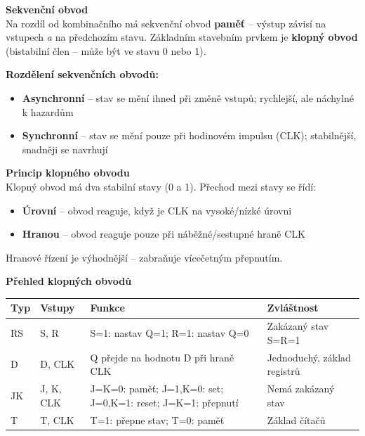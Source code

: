 \documentclass[a4paper,10pt]{article}
\begin{document}
\begin{vysvetlenibox}
\textbf{Sekvenční obvod}\\
Na rozdíl od kombinačního má sekvenční obvod \textbf{paměť} -- výstup závisí
na vstupech \textit{a} na předchozím stavu. Základním stavebním prvkem je
\textbf{klopný obvod} (bistabilní člen -- může být ve stavu 0 nebo 1).

\textbf{Rozdělení sekvenčních obvodů:}
\begin{itemize}[noitemsep, leftmargin=1.4em, topsep=4pt]
    \item \textbf{Asynchronní} -- stav se mění ihned při změně vstupů;
          rychlejší, ale náchylné k hazardům
    \item \textbf{Synchronní} -- stav se mění pouze při hodinovém impulsu (CLK);
          stabilnější, snadněji se navrhují
\end{itemize}

\textbf{Princip klopného obvodu}\\
Klopný obvod má dva stabilní stavy (0 a 1). Přechod mezi stavy se řídí:
\begin{itemize}[noitemsep, leftmargin=1.4em, topsep=4pt]
    \item \textbf{Úrovní} -- obvod reaguje, když je CLK na vysoké/nízké úrovni
    \item \textbf{Hranou} -- obvod reaguje pouze při náběžné/sestupné hraně CLK
\end{itemize}
Hranové řízení je výhodnější -- zabraňuje vícečetným přepnutím.

\textbf{Přehled klopných obvodů}

\begin{center}
\begin{tabularx}{0.95\linewidth}{@{} l l X l @{}}
    \toprule
    \textbf{Typ} & \textbf{Vstupy} & \textbf{Funkce} & \textbf{Zvláštnost} \\
    \midrule
    RS  & S, R       & S=1: nastav Q=1; R=1: nastav Q=0
                     & Zakázaný stav S=R=1 \\
    D   & D, CLK     & Q přejde na hodnotu D při hraně CLK
                     & Jednoduchý, základ registrů \\
    JK  & J, K, CLK  & J=K=0: paměť; J=1,K=0: set; J=0,K=1: reset;
                       J=K=1: přepnutí
                     & Nemá zakázaný stav \\
    T   & T, CLK     & T=1: přepne stav; T=0: paměť
                     & Základ čítačů \\
    \bottomrule
\end{tabularx}
\end{center}


\end{vysvetlenibox}
\end{document}
